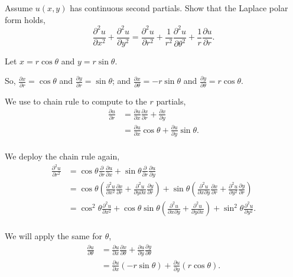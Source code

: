 \documentclass{article}
\begin{document}
  \begin{problem}
    Assume $u(x,y)$ has continuous second partials. Show that the Laplace polar form holds,  \[
      \frac{\partial^2 u}{\partial x^2}+\frac{\partial^2 u}{\partial y^2}=\frac{\partial^2 u}{\partial r^2}+\frac{1}{r^2}\frac{\partial^2 u}{\partial \theta^2}+\frac{1}{r}\frac{\partial u}{\partial r}
    .\] 
  \end{problem}

  Let $x=r\cos\theta$ and $y=r\sin\theta$.

  So, $\frac{\partial x}{\partial r}=\cos \theta$ and $\frac{\partial y}{\partial r}=\sin \theta$; and $\frac{\partial x}{\partial \theta}=-r\sin \theta$ and $\frac{\partial y}{\partial \theta}=r\cos \theta$.

  We use to chain rule to compute to the $r$ partials,
  \begin{align*}
    \frac{\partial u}{\partial r} &= \frac{\partial u}{\partial x}\frac{\partial x}{\partial r}+\frac{\partial x}{\partial y} \\
    &= \frac{\partial u}{\partial x}\cos \theta+\frac{\partial u}{\partial y} \sin \theta. \\
  \end{align*}

  We deploy the chain rule again,
  \begin{align*}
    \frac{\partial^{2} u}{\partial r^2}&=\cos \theta\frac{\partial}{\partial r}\frac{\partial u}{\partial x} + \sin \theta\frac{\partial}{\partial r}\frac{\partial u}{\partial y}\\
    &= \cos \theta\left( \frac{\partial^{2} u}{\partial x^2}\frac{\partial x}{\partial r}+\frac{\partial^2 u}{\partial y \partial x}\frac{\partial y}{\partial r} \right)+\sin \theta\left( \frac{\partial^2 u}{\partial x \partial y}\frac{\partial x}{\partial r}+\frac{\partial^{2} u}{\partial y^2}\frac{\partial y}{\partial r} \right)   \\
    &= \cos^2 \theta \frac{\partial^{2} u}{\partial x^2} + \cos \theta \sin \theta \left( \frac{\partial^2 u}{\partial x \partial y}+\frac{\partial^2 u}{\partial y \partial x} \right) +\sin^2 \theta \frac{\partial^{2} u}{\partial y^2}. \\
  \end{align*}

  We will apply the same for $\theta$,
  \begin{align*}
    \frac{\partial u}{\partial \theta}&= \frac{\partial u}{\partial x}\frac{\partial x}{\partial \theta}+\frac{\partial u}{\partial y}\frac{\partial y}{\partial \theta} \\
    &= \frac{\partial u}{\partial x}(-r\sin \theta)+\frac{\partial u}{\partial y}(r\cos \theta). \\
  \end{align*}
\end{document}
